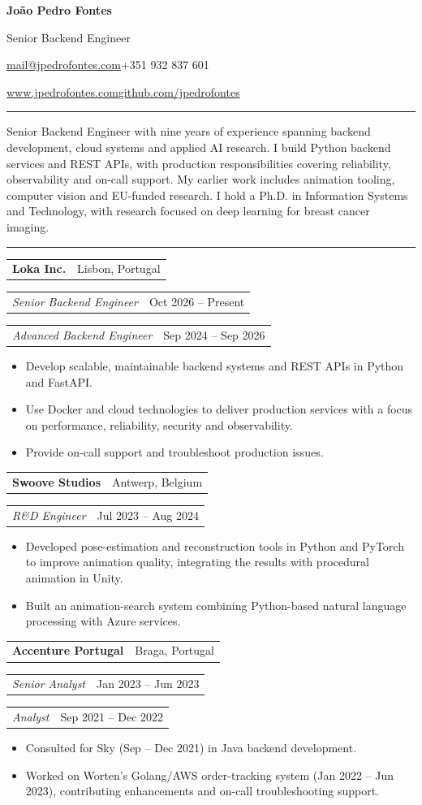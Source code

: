 \documentclass[11pt,a4paper]{article}
\makeatletter
\newcommand{\cvsection}[1]{\par\addvspace{10pt}\needspace{4\baselineskip}{\large\bfseries #1}\par\nobreak\vspace{2pt}\hrule\nobreak\vspace{5pt}}
\newcommand{\cvcompany}[2]{\par\addvspace{11pt}\needspace{6\baselineskip}\begin{tabularx}{\linewidth}{@{}Xr@{}}\textbf{#1} & {\small #2}\end{tabularx}\par\nobreak}
\newcommand{\cvrole}[2]{\par\addvspace{2pt}\needspace{2\baselineskip}\begin{tabularx}{\linewidth}{@{}Xr@{}}\textit{#1} & {\small #2}\end{tabularx}\par\nobreak}
\makeatother
\begin{document}
{\LARGE\bfseries Jo\~ao Pedro Fontes}\par
{\large Senior Backend Engineer}\par
\href{mailto:mail@jpedrofontes.com}{mail@jpedrofontes.com}\enspace\textbar\enspace +351 932 837 601\par
\href{https://www.jpedrofontes.com}{www.jpedrofontes.com}\enspace\textbar\enspace\href{https://github.com/jpedrofontes}{github.com/jpedrofontes}

\cvsection{About}
Senior Backend Engineer with nine years of experience spanning backend development, cloud systems and applied AI research. I build Python backend services and REST APIs, with production responsibilities covering reliability, observability and on-call support. My earlier work includes animation tooling, computer vision and EU-funded research. I hold a Ph.D. in Information Systems and Technology, with research focused on deep learning for breast cancer imaging.

\cvsection{Experience}

\cvcompany{Loka Inc.}{Lisbon, Portugal}
\cvrole{Senior Backend Engineer}{Oct 2026 -- Present}
\cvrole{Advanced Backend Engineer}{Sep 2024 -- Sep 2026}
\begin{itemize}
    \item Develop scalable, maintainable backend systems and REST APIs in Python and FastAPI.
    \item Use Docker and cloud technologies to deliver production services with a focus on performance, reliability, security and observability.
    \item Provide on-call support and troubleshoot production issues.
\end{itemize}

\cvcompany{Swoove Studios}{Antwerp, Belgium}
\cvrole{R\&D Engineer}{Jul 2023 -- Aug 2024}
\begin{itemize}
    \item Developed pose-estimation and reconstruction tools in Python and PyTorch to improve animation quality, integrating the results with procedural animation in Unity.
    \item Built an animation-search system combining Python-based natural language processing with Azure services.
\end{itemize}

\cvcompany{Accenture Portugal}{Braga, Portugal}
\cvrole{Senior Analyst}{Jan 2023 -- Jun 2023}
\cvrole{Analyst}{Sep 2021 -- Dec 2022}
\begin{itemize}
    \item Consulted for Sky (Sep -- Dec 2021) in Java backend development.
    \item Worked on Worten's Golang/AWS order-tracking system (Jan 2022 -- Jun 2023), contributing enhancements and on-call troubleshooting support.
\end{itemize}
\end{document}
